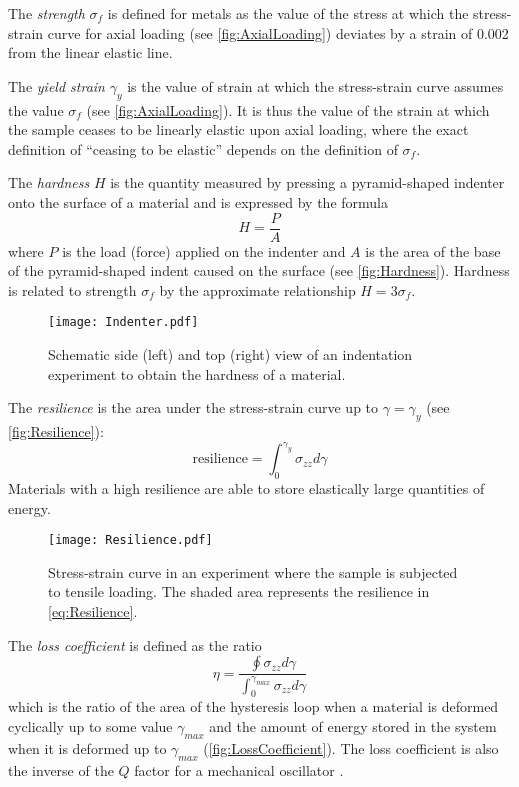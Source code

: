 The \emph{strength} $\sigma_{f}$ is defined for metals as the value of the stress at which the stress-strain curve for axial loading (see \autoref{fig:AxialLoading}) deviates by a strain of 0.002 from the linear elastic line.

The \emph{yield strain} $\gamma_{y}$ is the value of strain at which the stress-strain curve assumes the value $\sigma_{f}$ (see \autoref{fig:AxialLoading}). It is thus the value of the strain at which the sample ceases to be linearly elastic upon axial loading, where the exact definition of ``ceasing to be elastic'' depends on the definition of $\sigma_{f}$. 

The \emph{hardness} $H$ is the quantity measured by pressing a pyramid-shaped indenter onto the surface of a material and is expressed by the formula
\begin{equation}
	H = \frac{P}{A}
\end{equation}
where $P$ is the load (force) applied on the indenter and $A$ is the area of the base of the pyramid-shaped indent caused on the surface (see \autoref{fig:Hardness}). Hardness is related to strength $\sigma_{f}$ by the approximate relationship $H = 3\sigma_{f}$.

\begin{figure}[h!] 
	\centering 
	\texttt{[image: Indenter.pdf]} 
	\caption{Schematic side (left) and top (right) view of an indentation experiment to obtain the hardness of a material. \label{fig:Hardness}}
\end{figure}

The \emph{resilience} is the area under the stress-strain curve up to $\gamma = \gamma_{y}$ (see \autoref{fig:Resilience}):
\begin{equation}
	\text{resilience} = \int_{0}^{\gamma_{y}} \sigma_{zz} d\gamma
	\label{eq:Resilience}
\end{equation}
Materials with a high resilience are able to store elastically large quantities of energy.

\begin{figure}[h!] 
\centering 
\texttt{[image: Resilience.pdf]} 
\caption{Stress-strain curve in an experiment where the sample is subjected to tensile loading. The shaded area represents the resilience in \autoref{eq:Resilience}. \label{fig:Resilience}}
\end{figure}

The \emph{loss coefficient} is defined as the ratio
\begin{equation}
	\eta =  \frac{\oint \sigma_{zz} d\gamma}{\int_{0}^{\gamma_{max}} \sigma_{zz} d\gamma}
	\label{eq:LossCoefficient}
\end{equation}
which is the ratio of the area of the hysteresis loop when a material is deformed cyclically up to some value $\gamma_{max}$ and the amount of energy stored in the system when it is deformed up to $\gamma_{max}$ (\autoref{fig:LossCoefficient}). The loss coefficient is also the inverse of the $Q$ factor for a mechanical oscillator \cite{ashby2005materials}.

